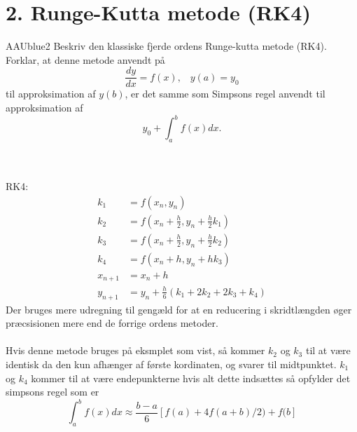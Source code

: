 \section*{2. Runge-Kutta metode (RK4)}
% 
%
\begin{color}{AAUblue2}
%
Beskriv den klassiske fjerde ordens Runge-kutta metode (RK4). 
Forklar, at denne metode anvendt på
$$\frac{dy}{dx}=f(x), \phantom{...}y(a)=y_0$$
til approksimation af $y(b)$, er det samme som Simpsons regel anvendt til approksimation af 
$$y_0+\int^b_a f(x)dx. $$
% 
\end{color}
\\\\
RK4:\\
\begin{align*}
k_1&=f(x_n,y_n)\\
k_2&=f(x_n+\frac{h}{2},y_n+\frac{h}{2}k_1)\\
k_3&=f(x_n+\frac{h}{2},y_n+\frac{h}{2}k_2)\\
k_4&=f(x_n+h,y_n+h k_3)\\
x_{n+1}&=x_n+h\\
y_{n+1}&=y_n+\frac{h}{6}(k_1+2k_2+2k_3+k_4)
\end{align*}
Der bruges mere udregning til gengæld for at en reducering i skridtlængden øger præcsisionen mere end de forrige ordens metoder.\\\\
% 
%
Hvis denne metode bruges på eksmplet som vist, så kommer $k_2$ og $k_3$ til at være identisk da den kun afhænger af første kordinaten, og svarer til midtpunktet. $k_1$ og $k_4$ kommer til at være endepunkterne hvis alt dette indsættes så opfylder det simpsons regel som er 
$$\int_a^bf(x)dx \approx \frac{b-a}{6}[f(a)+4f(a+b)/2)+f(b]$$

